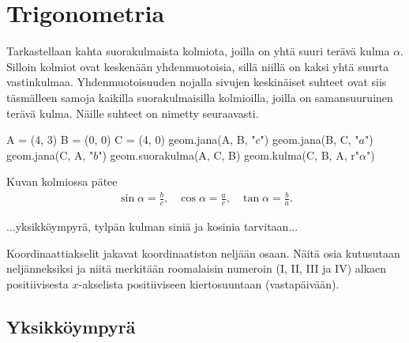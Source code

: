 \section*{Trigonometria}

Tarkastellaan kahta suorakulmaista kolmiota, joilla on yhtä suuri terävä kulma $\alpha$.
Silloin kolmiot ovat keskenään yhdenmuotoisia, sillä niillä on kaksi yhtä suurta vastinkulmaa.
Yhdenmuotoisuuden nojalla sivujen keskinäiset suhteet ovat siis täsmälleen samoja kaikilla
suorakulmaisilla kolmioilla, joilla on samansuuruinen terävä kulma. Näille suhteet on
nimetty seuraavasti.


\begin{esimerkki}
\begin{center}
\begin{kuva}
	A = (4, 3)
	B = (0, 0)
	C = (4, 0)
	geom.jana(A, B, "$c$")
	geom.jana(B, C, "$a$")
	geom.jana(C, A, "$b$")
	geom.suorakulma(A, C, B)
	geom.kulma(C, B, A, r"$\alpha$")
\end{kuva}
\end{center}
Kuvan kolmiossa pätee
\[
\begin{array}{ccc}
\displaystyle\sin \alpha = \frac{b}{c}, &
\displaystyle\cos \alpha = \frac{a}{c}, &
\displaystyle\tan \alpha = \frac{b}{a}.
\end{array}
\]
\end{esimerkki}

...yksikköympyrä, tylpän kulman siniä ja kosinia tarvitaan...


Koordinaattiakselit jakavat koordinaatiston neljään osaan. Näitä osia kutusutaan neljänneksiksi ja niitä merkitään roomalaisin numeroin (I, II, III ja IV) alkaen positiivisesta $x$-akselista positiiviseen kiertosuuntaan (vastapäivään).

\subsection*{Yksikköympyrä}


